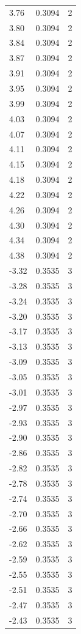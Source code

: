 \begin{longtable}{lrr}
  3.76 & 0.3094 & 2 \\
  3.80 & 0.3094 & 2 \\
  3.84 & 0.3094 & 2 \\
  3.87 & 0.3094 & 2 \\
  3.91 & 0.3094 & 2 \\
  3.95 & 0.3094 & 2 \\
  3.99 & 0.3094 & 2 \\
  4.03 & 0.3094 & 2 \\
  4.07 & 0.3094 & 2 \\
  4.11 & 0.3094 & 2 \\
  4.15 & 0.3094 & 2 \\
  4.18 & 0.3094 & 2 \\
  4.22 & 0.3094 & 2 \\
  4.26 & 0.3094 & 2 \\
  4.30 & 0.3094 & 2 \\
  4.34 & 0.3094 & 2 \\
  4.38 & 0.3094 & 2 \\
  -3.32 & 0.3535 & 3 \\
  -3.28 & 0.3535 & 3 \\
  -3.24 & 0.3535 & 3 \\
  -3.20 & 0.3535 & 3 \\
  -3.17 & 0.3535 & 3 \\
  -3.13 & 0.3535 & 3 \\
  -3.09 & 0.3535 & 3 \\
  -3.05 & 0.3535 & 3 \\
  -3.01 & 0.3535 & 3 \\
  -2.97 & 0.3535 & 3 \\
  -2.93 & 0.3535 & 3 \\
  -2.90 & 0.3535 & 3 \\
  -2.86 & 0.3535 & 3 \\
  -2.82 & 0.3535 & 3 \\
  -2.78 & 0.3535 & 3 \\
  -2.74 & 0.3535 & 3 \\
  -2.70 & 0.3535 & 3 \\
  -2.66 & 0.3535 & 3 \\
  -2.62 & 0.3535 & 3 \\
  -2.59 & 0.3535 & 3 \\
  -2.55 & 0.3535 & 3 \\
  -2.51 & 0.3535 & 3 \\
  -2.47 & 0.3535 & 3 \\
  -2.43 & 0.3535 & 3 \\

\end{longtable}
